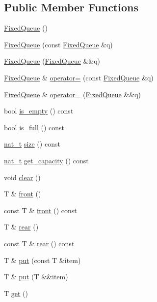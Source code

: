 \subsection*{Public Member Functions}
\begin{DoxyCompactItemize}
\item 
\hyperlink{class_designar_1_1_fixed_queue_ad55d01ff85b7d38e595ff2bd891a45b9}{Fixed\+Queue} ()
\item 
\hyperlink{class_designar_1_1_fixed_queue_a3e6393f6dbe99bbecb030f0a793892b8}{Fixed\+Queue} (const \hyperlink{class_designar_1_1_fixed_queue}{Fixed\+Queue} \&q)
\item 
\hyperlink{class_designar_1_1_fixed_queue_a74d27c0f06b0b91c34768f7501a77afd}{Fixed\+Queue} (\hyperlink{class_designar_1_1_fixed_queue}{Fixed\+Queue} \&\&q)
\item 
\hyperlink{class_designar_1_1_fixed_queue}{Fixed\+Queue} \& \hyperlink{class_designar_1_1_fixed_queue_a317293ac30aa85f82daf9a2c1e295e9a}{operator=} (const \hyperlink{class_designar_1_1_fixed_queue}{Fixed\+Queue} \&q)
\item 
\hyperlink{class_designar_1_1_fixed_queue}{Fixed\+Queue} \& \hyperlink{class_designar_1_1_fixed_queue_aac0f8bc7f8ffacc543bac5917d8b1045}{operator=} (\hyperlink{class_designar_1_1_fixed_queue}{Fixed\+Queue} \&\&q)
\item 
bool \hyperlink{class_designar_1_1_fixed_queue_aa72d9c9dd2ce251b6d29b31c04ee6517}{is\+\_\+empty} () const
\item 
bool \hyperlink{class_designar_1_1_fixed_queue_a4d6bdd5d75d476d4af602781bd0d5b56}{is\+\_\+full} () const
\item 
\hyperlink{namespace_designar_aa72662848b9f4815e7bf31a7cf3e33d1}{nat\+\_\+t} \hyperlink{class_designar_1_1_fixed_queue_a9fa2f855edd54de0c847c8ba35c804cf}{size} () const
\item 
\hyperlink{namespace_designar_aa72662848b9f4815e7bf31a7cf3e33d1}{nat\+\_\+t} \hyperlink{class_designar_1_1_fixed_queue_a786767a9a56c0c4b1e93631b509f0fa1}{get\+\_\+capacity} () const
\item 
void \hyperlink{class_designar_1_1_fixed_queue_ae5e1454766e792f8dbad9f1b49437fe6}{clear} ()
\item 
T \& \hyperlink{class_designar_1_1_fixed_queue_a2440b268443093f6ff306e956d7f0616}{front} ()
\item 
const T \& \hyperlink{class_designar_1_1_fixed_queue_ab86601d018b664a2f0d522bca18ee107}{front} () const
\item 
T \& \hyperlink{class_designar_1_1_fixed_queue_a820470e5e649e48a352b334f158c8eb3}{rear} ()
\item 
const T \& \hyperlink{class_designar_1_1_fixed_queue_ab634bd79b51287ddbcd1ba24bc72fcae}{rear} () const
\item 
T \& \hyperlink{class_designar_1_1_fixed_queue_ab8a9bf0adeaa3995e68d966d8a986904}{put} (const T \&item)
\item 
T \& \hyperlink{class_designar_1_1_fixed_queue_a66a9b9f7118ec4943f7af273879c6b52}{put} (T \&\&item)
\item 
T \hyperlink{class_designar_1_1_fixed_queue_aefa2e40721df2aff9ba56a2ef1f9db62}{get} ()
\end{DoxyCompactItemize}


